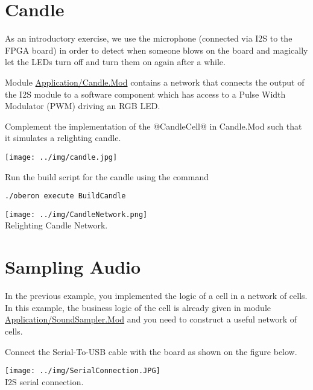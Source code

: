 \documentclass[10pt, a4]{article}
\begin{document}
\section{Candle}
\begin{minipage}{0.7\textwidth}
As an introductory exercise, we use the microphone (connected via I2S to the FPGA board) in order to detect when someone blows on the board and magically let the LEDs turn off and turn them on again after a while. 

Module \href{\apath/Application/Candle.Mod}{Application/Candle.Mod} contains a network that connects the output of the I2S module to a software component which has access to a Pulse Width Modulator (PWM) driving an RGB LED.

Complement the implementation of the @CandleCell@ in Candle.Mod such that it simulates a relighting candle.
\end{minipage} \hfill
\begin{minipage}{0.25\textwidth}
\texttt{[image: ../img/candle.jpg]}
\end{minipage}

Run the build script for the candle using the command
\begin{lstlisting}[style=example]
./oberon execute BuildCandle
\end{lstlisting}



\begin{center}
\texttt{[image: ../img/CandleNetwork.png]}\\
\footnotesize Relighting Candle Network.
\end{center}


\section{Sampling Audio}
In the previous example, you implemented the logic of a cell in a network of cells. In this example, the business logic of the cell is already given in module \href{\apath/Application/SoundSampler.Mod}{Application/SoundSampler.Mod} and you need to construct a useful network of cells. 

Connect the Serial-To-USB cable with the board as shown on the figure below.
\begin{center}
\texttt{[image: ../img/SerialConnection.JPG]}\\
\footnotesize  I2S serial connection.
\end{center}
\end{document}
